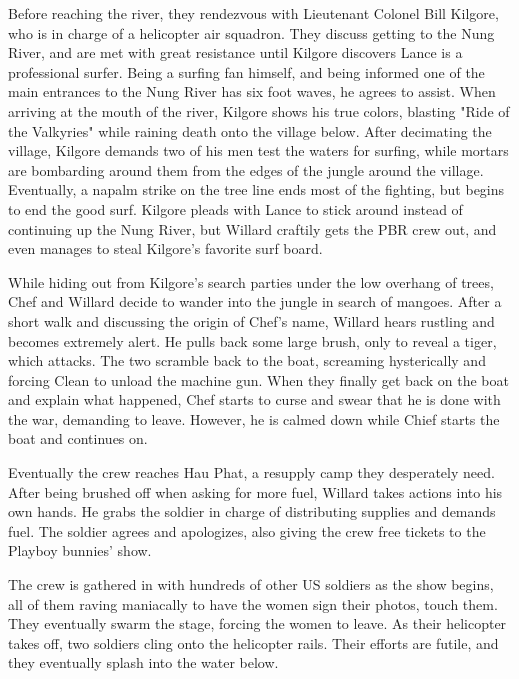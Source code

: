 \documentclass[a4paper,man,natbib]{apa6}
\begin{document}
Before reaching the river, they rendezvous with Lieutenant Colonel Bill Kilgore, who is in charge of a helicopter air squadron. They discuss getting to the Nung River, and are met with great resistance until Kilgore discovers Lance is a professional surfer. Being a surfing fan himself, and being informed one of the main entrances to the Nung River has six foot waves, he agrees to assist. When arriving at the mouth of the river, Kilgore shows his true colors, blasting "Ride of the Valkyries" while raining death onto the village below. After decimating the village, Kilgore demands two of his men test the waters for surfing, while mortars are bombarding around them from the edges of the jungle around the village. Eventually, a napalm strike on the tree line ends most of the fighting, but begins to end the good surf. Kilgore pleads with Lance to stick around instead of continuing up the Nung River, but Willard craftily gets the PBR crew out, and even manages to steal Kilgore's favorite surf board.

While hiding out from Kilgore's search parties under the low overhang of trees, Chef and Willard decide to wander into the jungle in search of mangoes. After a short walk and discussing the origin of Chef's name, Willard hears rustling and becomes extremely alert. He pulls back some large brush, only to reveal a tiger, which attacks. The two scramble back to the boat, screaming hysterically and forcing Clean to unload the machine gun. When they finally get back on the boat and explain what happened, Chef starts to curse and swear that he is done with the war, demanding to leave. However, he is calmed down while Chief starts the boat and continues on. 

Eventually the crew reaches Hau Phat, a resupply camp they desperately need. After being brushed off when asking for more fuel, Willard takes actions into his own hands. He grabs the soldier in charge of distributing supplies and demands fuel. The soldier agrees and apologizes, also giving the crew free tickets to the Playboy bunnies' show.

The crew is gathered in with hundreds of other US soldiers as the show begins, all of them raving maniacally to have the women sign their photos, touch them. They eventually swarm the stage, forcing the women to leave. As their helicopter takes off, two soldiers cling onto the helicopter rails. Their efforts are futile, and they eventually splash into the water below.
\end{document}
